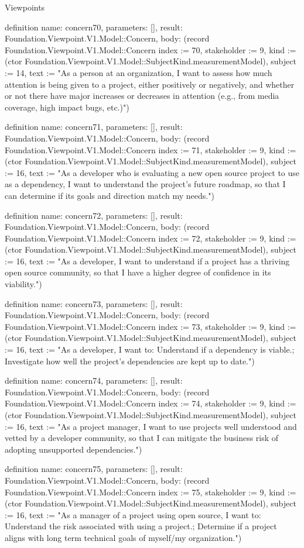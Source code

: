 \begin{lexlean}{Viewpoints}
\begin{semanticmodule}
definition{
  name: concern70,
  parameters: [],
  result: Foundation.Viewpoint.V1.Model::Concern,
  body: (record Foundation.Viewpoint.V1.Model::Concern {index := 70, stakeholder := 9, kind := (ctor Foundation.Viewpoint.V1.Model::SubjectKind.measurementModel), subject := 14, text := "As a person at an organization, I want to assess how much attention is being given to a project, either positively or negatively, and whether or not there have major increases or decreases in attention (e.g., from media coverage, high impact bugs, etc.)"})
}

definition{
  name: concern71,
  parameters: [],
  result: Foundation.Viewpoint.V1.Model::Concern,
  body: (record Foundation.Viewpoint.V1.Model::Concern {index := 71, stakeholder := 9, kind := (ctor Foundation.Viewpoint.V1.Model::SubjectKind.measurementModel), subject := 16, text := "As a developer who is evaluating a new open source project to use as a dependency, I want to understand the project's future roadmap, so that I can determine if its goals and direction match my needs."})
}

definition{
  name: concern72,
  parameters: [],
  result: Foundation.Viewpoint.V1.Model::Concern,
  body: (record Foundation.Viewpoint.V1.Model::Concern {index := 72, stakeholder := 9, kind := (ctor Foundation.Viewpoint.V1.Model::SubjectKind.measurementModel), subject := 16, text := "As a developer, I want to understand if a project has a thriving open source community, so that I have a higher degree of confidence in its viability."})
}

definition{
  name: concern73,
  parameters: [],
  result: Foundation.Viewpoint.V1.Model::Concern,
  body: (record Foundation.Viewpoint.V1.Model::Concern {index := 73, stakeholder := 9, kind := (ctor Foundation.Viewpoint.V1.Model::SubjectKind.measurementModel), subject := 16, text := "As a developer, I want to: Understand if a dependency is viable.; Investigate how well the project’s dependencies are kept up to date."})
}

definition{
  name: concern74,
  parameters: [],
  result: Foundation.Viewpoint.V1.Model::Concern,
  body: (record Foundation.Viewpoint.V1.Model::Concern {index := 74, stakeholder := 9, kind := (ctor Foundation.Viewpoint.V1.Model::SubjectKind.measurementModel), subject := 16, text := "As a project manager, I want to use projects well understood and vetted by a developer community, so that I can mitigate the business risk of adopting unsupported dependencies."})
}

definition{
  name: concern75,
  parameters: [],
  result: Foundation.Viewpoint.V1.Model::Concern,
  body: (record Foundation.Viewpoint.V1.Model::Concern {index := 75, stakeholder := 9, kind := (ctor Foundation.Viewpoint.V1.Model::SubjectKind.measurementModel), subject := 16, text := "As a manager of a project using open source, I want to: Understand the risk associated with using a project.; Determine if a project aligns with long term technical goals of myself/my organization."})
}


\end{semanticmodule}
\end{lexlean}
